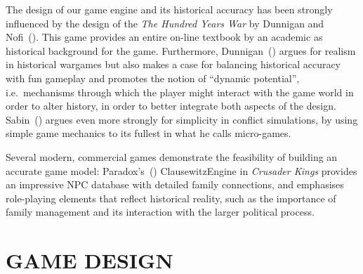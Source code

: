 \documentclass[11pt]{article}
\begin{document}
The design of our game engine and its historical accuracy has been
strongly influenced by the design of the \textit{The Hundred Years War}
by Dunnigan and Nofi~(\cite*{hyw}). This game  provides an entire on-line textbook by an
academic as historical background for the game. Furthermore,
Dunnigan~(\cite*{Dunnigan})  argues for realism in historical wargames but
also makes a case for balancing historical accuracy with fun gameplay
and promotes the notion of ``dynamic potential'',  i.e.\ mechanisms
through which the player might interact with the game world in order
to alter history, in order to better integrate both aspects of the
design. 
Sabin~(\cite*{Sabin}) argues even more strongly for simplicity in conflict simulations,
by using simple game mechanics to its fullest  in what he calls micro-games.


Several modern, commercial games demonstrate the feasibility of building an accurate game model:
Paradox's~(\cite*{ck2}) ClausewitzEngine in \textit{Crusader Kings\/} provides
an impressive NPC database with detailed family connections, and
emphasises  role-playing elements that reflect historical reality,
such as the importance of family management and its interaction with the
larger political process.


\section*{GAME DESIGN}

\end{document}
